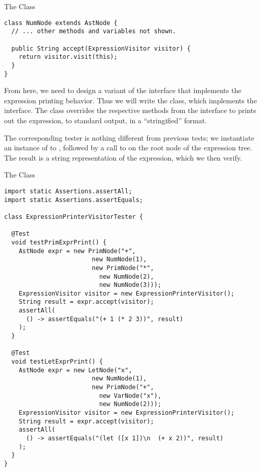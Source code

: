 \begin{cl}{The  Class}
\begin{lstlisting}[language=MyJava]
class NumNode extends AstNode {
  // ... other methods and variables not shown.

  public String accept(ExpressionVisitor visitor) {
    return visitor.visit(this);
  }
}
\end{lstlisting}
\end{cl}

From here, we need to design a variant of the interface that implements the expression printing behavior. Thus we will write the  class, which implements the  interface. The  class overrides the respective methods from the  interface to prints out the expression, to standard output, in a ``stringified'' format.

The corresponding tester is nothing different from previous tests; we instantiate an instance of  to , followed by a call to  on the root node of the expression tree. The result is a string representation of the expression, which we then verify.

\begin{cl}{The  Class}
\begin{lstlisting}[language=MyJava]
import static Assertions.assertAll;
import static Assertions.assertEquals;

class ExpressionPrinterVisitorTester {

  @Test
  void testPrimExprPrint() {
    AstNode expr = new PrimNode("+", 
                        new NumNode(1), 
                        new PrimNode("*", 
                          new NumNode(2), 
                          new NumNode(3)));
    ExpressionVisitor visitor = new ExpressionPrinterVisitor();
    String result = expr.accept(visitor);
    assertAll(
      () -> assertEquals("(+ 1 (* 2 3))", result)
    );
  }

  @Test
  void testLetExprPrint() {
    AstNode expr = new LetNode("x", 
                        new NumNode(1), 
                        new PrimNode("+", 
                          new VarNode("x"), 
                          new NumNode(2)));
    ExpressionVisitor visitor = new ExpressionPrinterVisitor();
    String result = expr.accept(visitor);
    assertAll(
      () -> assertEquals("(let ([x 1])\n  (+ x 2))", result)
    );
  }
}
\end{lstlisting}
\end{cl}

